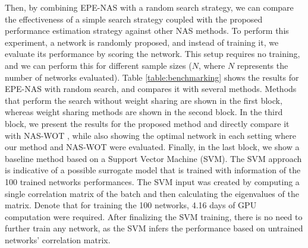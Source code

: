 \documentclass[10pt, conference]{IEEEtran}
\begin{document}
Then, by combining EPE-NAS with a random search strategy, we can compare the effectiveness of a simple search strategy coupled with the proposed performance estimation strategy against other NAS methods. To perform this experiment, a network is randomly proposed, and instead of training it, we evaluate its performance by scoring the network. This setup requires no training, and we can perform this for different sample sizes ($N$, where $N$ represents the number of networks evaluated). Table \ref{table:benchmarking} shows the results for EPE-NAS with random search, and compares it with several methods. Methods that perform the search without weight sharing are shown in the first block, whereas weight sharing methods are shown in the second block. In the third block, we present the results for the proposed method and directly compare it with NAS-WOT \cite{mellor2020neural}, while also showing the optimal network in each setting where our method and NAS-WOT were evaluated. Finally, in the last block, we show a baseline method based on a Support Vector Machine (SVM). The SVM approach is indicative of a possible surrogate model that is trained with information of the 100 trained networks performances. The SVM input was created by computing a single correlation matrix of the batch and then calculating the eigenvalues of the matrix. Denote that for training the 100 networks, 4.16 days of GPU computation were required. After finalizing the SVM training, there is no need to further train any network, as the SVM infers the performance based on untrained networks' correlation matrix.
\end{document}
